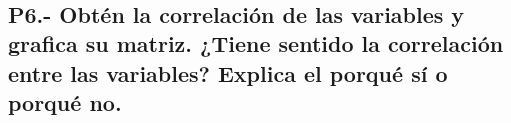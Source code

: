 \documentclass[11pt]{article}
\begin{document}
    \begin{center}
    \end{center}
    { \hspace*{\fill} \\}
    
    \begin{center}
    \end{center}
    { \hspace*{\fill} \\}
    
    \begin{center}
    \end{center}
    { \hspace*{\fill} \\}
    
    \begin{center}
    \end{center}
    { \hspace*{\fill} \\}
    
    \begin{center}
    \end{center}
    { \hspace*{\fill} \\}
    
    \begin{center}
    \end{center}
    { \hspace*{\fill} \\}
    
    \hypertarget{p6.--obtuxe9n-la-correlaciuxf3n-de-las-variables-y-grafica-su-matriz.-tiene-sentido-la-correlaciuxf3n-entre-las-variables-explica-el-porquuxe9-suxed-o-porquuxe9-no.}{%
\subsection{P6.- Obtén la correlación de las variables y grafica su
matriz. ¿Tiene sentido la correlación entre las variables? Explica el
porqué sí o porqué
no.}\label{p6.--obtuxe9n-la-correlaciuxf3n-de-las-variables-y-grafica-su-matriz.-tiene-sentido-la-correlaciuxf3n-entre-las-variables-explica-el-porquuxe9-suxed-o-porquuxe9-no.}}
\end{document}
